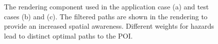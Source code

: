 \documentclass{egpubl}
\begin{document}
\begin{figure}
{        \label{fig:overview:case:arena}
   }
   \hfill{}
   \caption{The rendering component used in the application case (a) and test cases (b) and (c). The filtered paths are shown in the rendering to provide an increased spatial awareness. Different weights for hazards lead to distinct optimal paths to the POI.}
\end{figure}
\end{document}
